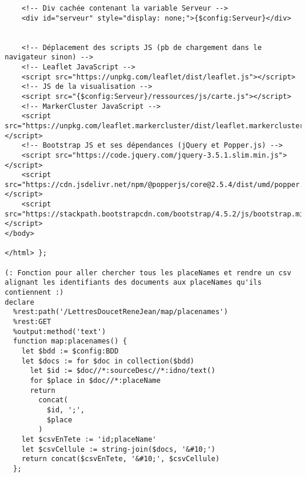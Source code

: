 \begin{verbatim}
    <!-- Div cachée contenant la variable Serveur -->
    <div id="serveur" style="display: none;">{$config:Serveur}</div> 


    <!-- Déplacement des scripts JS (pb de chargement dans le navigateur sinon) -->
    <!-- Leaflet JavaScript -->
    <script src="https://unpkg.com/leaflet/dist/leaflet.js"></script>   
    <!-- JS de la visualisation -->
    <script src="{$config:Serveur}/ressources/js/carte.js"></script>
    <!-- MarkerCluster JavaScript -->
    <script src="https://unpkg.com/leaflet.markercluster/dist/leaflet.markercluster.js"></script>
    <!-- Bootstrap JS et ses dépendances (jQuery et Popper.js) -->
    <script src="https://code.jquery.com/jquery-3.5.1.slim.min.js"></script>
    <script src="https://cdn.jsdelivr.net/npm/@popperjs/core@2.5.4/dist/umd/popper.min.js"></script>
    <script src="https://stackpath.bootstrapcdn.com/bootstrap/4.5.2/js/bootstrap.min.js"></script>
</body>

</html> };

(: Fonction pour aller chercher tous les placeNames et rendre un csv alignant les identifiants des documents aux placeNames qu'ils contiennent :)
declare 
  %rest:path('/LettresDoucetReneJean/map/placenames')
  %rest:GET
  %output:method('text')
  function map:placenames() {
    let $bdd := $config:BDD
    let $docs := for $doc in collection($bdd)
      let $id := $doc//*:sourceDesc//*:idno/text()
      for $place in $doc//*:placeName
      return 
        concat(
          $id, ';', 
          $place
        )
    let $csvEnTete := 'id;placeName'
    let $csvCellule := string-join($docs, '&#10;')
    return concat($csvEnTete, '&#10;', $csvCellule)
  };  
\end{verbatim}